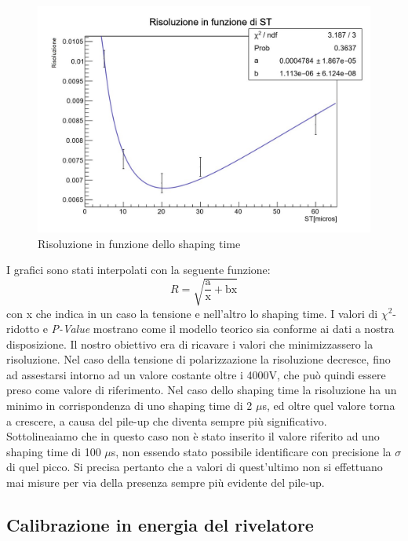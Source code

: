 \documentclass[a4paper,10pt]{article}
\begin{document}
\begin{figure}[!ht]
    \centering
    \includegraphics[scale=0.5]{grafici/risoluzionest}
    \caption{Risoluzione in funzione dello shaping time}
\end{figure}

\noindent I grafici sono stati interpolati con la seguente funzione: 
\begin{equation}
	R=\sqrt{\frac{\textrm{a}}{\textrm{x}}+\textrm{bx}}
\end{equation}
con x che indica in un caso la tensione e nell'altro lo shaping time.
\noindent I valori di $\chi^2$-ridotto e \textit{P-Value} mostrano come il modello teorico sia conforme ai dati a nostra disposizione.
\noindent Il nostro obiettivo era di ricavare i valori che minimizzassero la risoluzione. Nel caso della tensione di polarizzazione la risoluzione decresce, fino ad assestarsi intorno ad un valore costante oltre i 4000V, che pu\`o quindi essere preso come valore di riferimento. Nel caso dello shaping time la risoluzione ha un minimo in corrispondenza di uno shaping time di 2 $\mu$s, ed oltre quel valore torna a crescere, a causa del pile-up che diventa sempre pi\`u significativo. Sottolineaiamo che in questo caso non \`e stato inserito il valore riferito ad uno shaping time di 100 $\mu$s, non essendo stato possibile identificare con precisione la $\sigma$ di quel picco. Si precisa pertanto che a valori di quest'ultimo non si effettuano mai misure per via della presenza sempre pi\`u evidente del pile-up.
\subsection{Calibrazione in energia del rivelatore}
\end{document}
